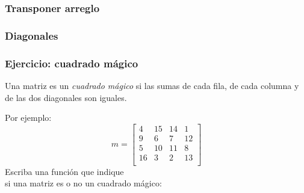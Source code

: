 \documentclass[12pt]{beamer}
\begin{document}
  \begin{frame}
    \label{transponer}
    \frametitle{Transponer arreglo}
    
  \end{frame}

  \begin{frame}
    \label{diagonales}
    \frametitle{Diagonales}
    
  \end{frame}


  \begin{frame}
    \label{cuadrado-magico}
    \frametitle{Ejercicio: cuadrado mágico}
    Una matriz es un \emph{cuadrado mágico}
    si las sumas de cada fila, de cada columna
    y de las dos diagonales son iguales.

    Por ejemplo:
    \[
      m =
      \begin{bmatrix}
         4 & 15 & 14 &  1 \\
         9 &  6 &  7 & 12 \\
         5 & 10 & 11 &  8 \\
        16 &  3 &  2 & 13 \\
      \end{bmatrix}
    \]
    Escriba una función que indique \\
    si una matriz es o no un cuadrado mágico:
    
  \end{frame}
\end{document}
